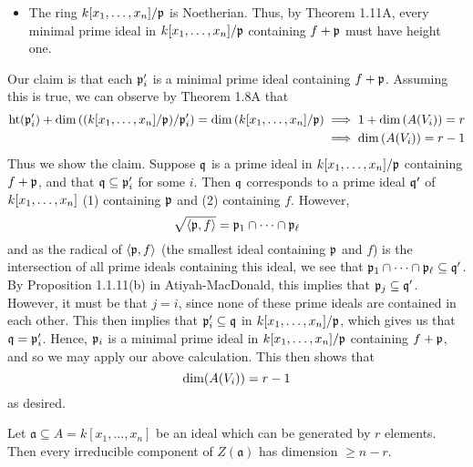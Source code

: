\documentclass[10pt]{amsart}
\begin{document}
\begin{solution}
{\begin{itemize}
       \item The ring $k[x_1, \dots, x_n]/\mathfrak{p}$ is Noetherian. Thus, by 
       Theorem 1.11A, every minimal prime ideal in $k[x_1, \dots, x_n]/\mathfrak{p}$
       containing $f + \mathfrak{p}$ must have height one.
   \end{itemize}
   Our claim is that each $\mathfrak{p}'_i$ is a minimal prime ideal 
   containing $f + \mathfrak{p}$. Assuming this is true, we can observe 
   by Theorem 1.8A that 
   \begin{align*}
       \operatorname{\rm{ht}}(\mathfrak{p}_i') + \operatorname{\rm{dim}}\left( (k[x_1, \dots, x_n]/\mathfrak{p})/\mathfrak{p}'_i \right) = \operatorname{\rm{dim}}\left( k[x_1, \dots, x_n]/\mathfrak{p} \right)
       &\implies 
       1 +  \operatorname{\rm{dim}}\left( A(V_i) \right) = r\\
       &\implies 
       \operatorname{\rm{dim}}\left( A(V_i) \right) = r - 1
   \end{align*}
   Thus we show the claim. Suppose $\mathfrak{q}$ is a prime ideal in $k[x_1, \dots, x_n]/\mathfrak{p}$ 
   containing $f + \mathfrak{p}$, and that $\mathfrak{q} \subseteq \mathfrak{p}'_i$ for some $i$. 
   Then $\mathfrak{q}$ corresponds to a prime ideal $\mathfrak{q}'$ of $k[x_1, \dots, x_n]$ (1) containing $\mathfrak{p}$ and (2) 
   containing $f$. However, 
   \[
       \sqrt{\left<\mathfrak{p}, f\right>} = \mathfrak{p}_1 \cap \cdots \cap \mathfrak{p}_{\ell}
   \]
   and as the radical of $\left<\mathfrak{p}, f\right>$ (the smallest ideal containing $\mathfrak{p}$ and $f$)
   is the intersection of all prime ideals containing this ideal, we see that 
   $\mathfrak{p}_1 \cap \cdots \cap \mathfrak{p}_{\ell} \subseteq \mathfrak{q}'$. By Proposition 1.1.11(b) in Atiyah-MacDonald, 
   this implies that $\mathfrak{p}_j \subseteq \mathfrak{q}'$. However, it must be that 
   $j = i$, since none of these prime ideals 
   are contained in each other. This then implies that 
   $\mathfrak{p}'_i \subseteq \mathfrak{q}$ in $k[x_1, \dots, x_n]/\mathfrak{p}$, which gives us that $\mathfrak{q} = \mathfrak{p}_i'$. 
   Hence, $\mathfrak{p}_i$ is a minimal prime ideal in $k[x_1, \dots, x_n]/\mathfrak{p}$ containing $f+\mathfrak{p}$, and 
   so we may apply our above calculation. This then shows that 
   \[
       \operatorname{\rm{dim}}(A(V_i)) = r - 1  
   \]
   as desired.}
\end{solution}

\begin{exercise}[1.9]
    Let $\mathfrak{a} \subseteq A = k[x_1,\ldots,x_n]$ be an ideal which can be
    generated by $r$ elements.
    Then every irreducible component of $Z(\mathfrak{a})$ has dimension $\ge n-r$.
\end{exercise}
\end{document}
